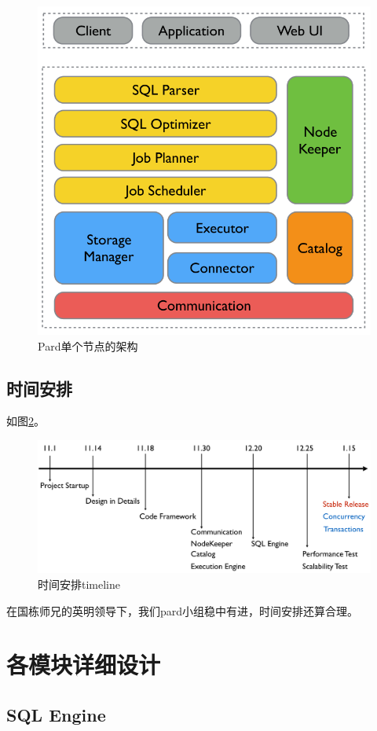 \documentclass[a4paper, 12pt]{ctexart}
\begin{document}
\begin{figure}[htbp]
	\centering
	\includegraphics[width=0.7\linewidth]{figure/pard-node-in.png}
	\caption{Pard单个节点的架构}
	\label{fig:node1}
\end{figure}


\subsection{时间安排}
如图\ref{fig:tl}。

\begin{figure}[htbp]
	\centering
	\includegraphics[width=\linewidth]{figure/timeline.png}
	\caption{时间安排timeline}
	\label{fig:tl}
\end{figure}
在国栋师兄的英明领导下，我们pard小组稳中有进，时间安排还算合理。

\section{各模块详细设计}

\subsection{SQL Engine}
\end{document}
